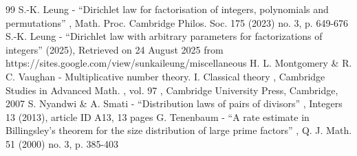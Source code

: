 \documentclass[11pt]{article}
\theoremstyle{plain}
\theoremstyle{definition}
\begin{document}
\begin{thebibliography}{99}
 S.-K. Leung - “Dirichlet law for factorisation of integers, polynomials and permutations” , Math. Proc. Cambridge Philos. Soc. 175 (2023) no. 3, p. 649-676
 S.-K. Leung - “Dirichlet law with arbitrary parameters for factorizations of integers” (2025), Retrieved on 24 August 2025 from https://sites.google.com/view/sunkaileung/miscellaneous
 H. L. Montgomery \& R. C. Vaughan - Multiplicative number theory. I. Classical theory , Cambridge Studies in Advanced Math. , vol. 97 , Cambridge University Press, Cambridge, 2007
 S. Nyandwi \& A. Smati - “Distribution laws of pairs of divisors” , Integers 13 (2013), article ID A13, 13 pages
 G. Tenenbaum - “A rate estimate in Billingsley’s theorem for the size distribution of large prime factors” , Q. J. Math. 51 (2000) no. 3, p. 385-403
\end{thebibliography}
\end{document}

